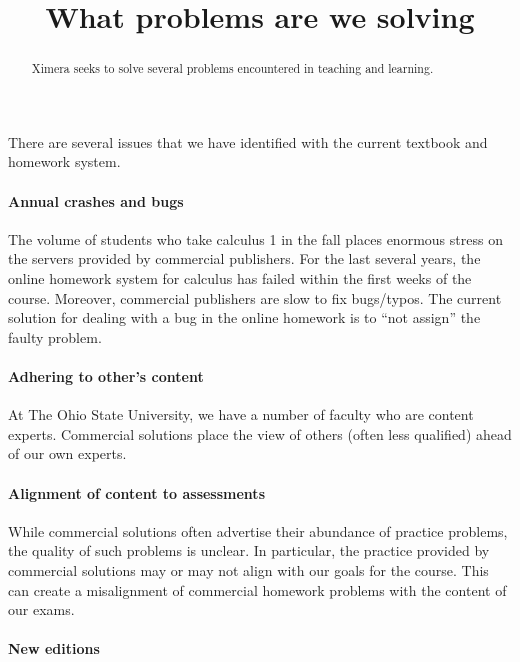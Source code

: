 \documentclass{ximera}
\title{What problems are we solving}
\begin{document}
\begin{abstract}
  Ximera seeks to solve several problems encountered in teaching and
  learning.
\end{abstract}
\maketitle

There are several issues that we have identified with the current
textbook and homework system.

\paragraph{Annual crashes and bugs}

The volume of students who take calculus 1 in the fall places enormous
stress on the servers provided by commercial publishers. For the last
several years, the online homework system for calculus has failed
within the first weeks of the course.  Moreover, commercial publishers
are slow to fix bugs/typos. The current solution for dealing with a
bug in the online homework is to ``not assign'' the faulty problem.

\paragraph{Adhering to other's content}

At The Ohio State University, we have a number of faculty who are
content experts. Commercial solutions place the view of others (often
less qualified) ahead of our own experts. 


\paragraph{Alignment of content to assessments}

While commercial solutions often advertise their abundance of practice
problems, the quality of such problems is unclear. In particular, the
practice provided by commercial solutions may or may not align with
our goals for the course. This can create a misalignment of commercial
homework problems with the content of our exams.


\paragraph{New editions}
\end{document}

